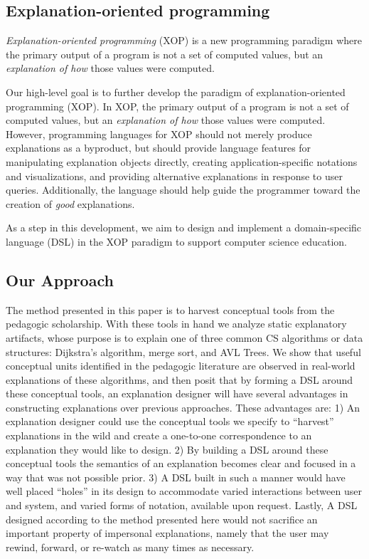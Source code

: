 \documentclass[conference]{IEEEtran}
\begin{document}
\subsection{Explanation-oriented programming}

\emph{Explanation-oriented programming} (XOP) is a new programming paradigm
where the primary output of a program is not a set of computed values, but an
\emph{explanation of how} those values were computed. 


Our high-level goal is to further develop the paradigm of explanation-oriented
programming (XOP). In XOP, the primary output of a program is not a set of
computed values, but an \emph{explanation of how} those values were computed.
However, programming languages for XOP should not merely produce explanations
as a byproduct, but should provide language features for manipulating
explanation objects directly, creating application-specific notations and
visualizations, and providing alternative explanations in response to user
queries. Additionally, the language should help guide the programmer toward the
creation of \emph{good} explanations.

As a step in this development, we aim to design and implement a domain-specific
language (DSL) in the XOP paradigm to support computer science education. 

\subsection{Our Approach}
The method presented in this paper is to harvest conceptual tools from the
pedagogic scholarship. With these tools in hand we analyze static explanatory
artifacts, whose purpose is to explain one of three common CS algorithms or data
structures: Dijkstra's algorithm, merge sort, and AVL Trees. We show that useful
conceptual units identified in the pedagogic literature are observed in
real-world explanations of these algorithms, and then posit that by forming a
DSL around these conceptual tools, an explanation designer will have several
advantages in constructing explanations over previous approaches. These
advantages are: 1) An explanation designer could use the conceptual tools we
specify to ``harvest'' explanations in the wild and create a one-to-one
correspondence to an explanation they would like to design. 2) By building a DSL
around these conceptual tools the semantics of an explanation becomes clear and
focused in a way that was not possible prior. 3) A DSL built in such a manner
would have well placed ``holes'' in its design to accommodate varied
interactions between user and system, and varied forms of notation, available
upon request. Lastly, A DSL designed according to the method presented here
would not sacrifice an important property of impersonal explanations, namely
that the user may rewind, forward, or re-watch as many times as necessary.
\end{document}
